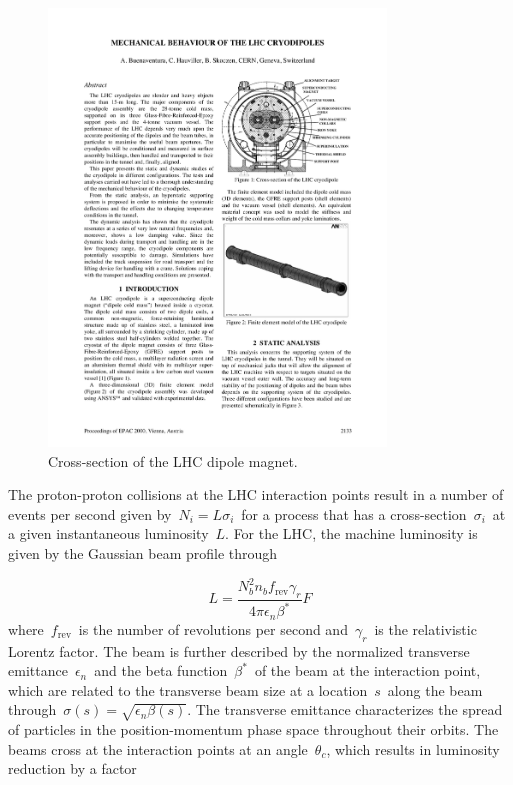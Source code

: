 \begin{figure}
\begin{centering}
\includegraphics[width=0.8\textwidth]{figures/exp/cryodipole.pdf}
\caption{Cross-section of the LHC dipole magnet.}
\label{fig:lhc_magnet}
\end{centering}
\end{figure}

The proton-proton collisions at the LHC interaction points result in a number of events per second given by~$N_i = L \sigma_i$~for a process that has a cross-section~$\sigma_i$~at a given instantaneous luminosity~$L$. For the LHC, the machine luminosity is given by the Gaussian beam profile through

\begin{equation}
L = \frac{N_b^2 n_b f_\mathrm{rev} \gamma_r}{4 \pi \epsilon_n \beta^*} F
\end{equation}
where~$f_{\mathrm{rev}}$~is the number of revolutions per second and~$\gamma_r$~is the relativistic Lorentz factor. The beam is further described by the normalized transverse emittance~$\epsilon_n$~and the beta function~$\beta^*$~of the beam at the interaction point, which are related to the transverse beam size at a location~$s$~along the beam through~$\sigma(s) = \sqrt{\epsilon_n \beta(s)}$. The transverse emittance characterizes the spread of particles in the position-momentum phase space throughout their orbits. The beams cross at the interaction points at an angle~$\theta_c$, which results in luminosity reduction by a factor


